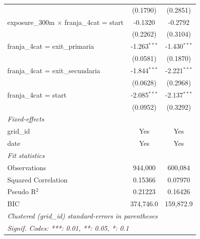 \begin{tabular}{lcc}
                                                               & (0.1790)          & (0.2851)\\   
   exposure\_300m $\times$ franja\_4cat = start                & -0.1320           & -0.2792\\   
                                                               & (0.2262)          & (0.3104)\\   
   franja\_4cat = exit\_primaria                               & -1.263$^{***}$    & -1.430$^{***}$\\   
                                                               & (0.0581)          & (0.1870)\\   
   franja\_4cat = exit\_secundaria                             & -1.844$^{***}$    & -2.221$^{***}$\\   
                                                               & (0.0628)          & (0.2968)\\   
   franja\_4cat = start                                        & -2.085$^{***}$    & -2.137$^{***}$\\   
                                                               & (0.0952)          & (0.3292)\\   
   \midrule
   \emph{Fixed-effects}\\
   grid\_id                                                    & Yes               & Yes\\  
   date                                                        & Yes               & Yes\\  
   \midrule
   \emph{Fit statistics}\\
   Observations                                                & 944,000           & 600,084\\  
   Squared Correlation                                         & 0.15366           & 0.07970\\  
   Pseudo R$^2$                                                & 0.21223           & 0.16426\\  
   BIC                                                         & 374,746.0         & 159,872.9\\  
   \midrule \midrule
   \multicolumn{3}{l}{\emph{Clustered (grid\_id) standard-errors in parentheses}}\\
   \multicolumn{3}{l}{\emph{Signif. Codes: ***: 0.01, **: 0.05, *: 0.1}}\\
\end{tabular}
\par\endgroup


